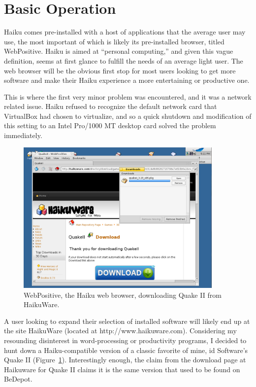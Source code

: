 \documentclass{article}
\newcommand{\figref}[1]{Figure~\ref{fig:#1}}
\begin{document}
\section{Basic Operation}

Haiku comes pre-installed with a host of applications that the average
user may use, the most important of which is likely its pre-installed
browser, titled WebPositive.  Haiku is aimed at ``personal
computing,'' and given this vague definition, seems at first glance to
fulfill the needs of an average light user. The web browser will be
the obvious first stop for most users looking to get more software and
make their Haiku experience a more entertaining or productive one.
	
This is where the first very minor problem was encountered, and it was
a network related issue. Haiku refused to recognize the default
network card that VirtualBox had chosen to virtualize, and so a quick
shutdown and modification of this setting to an Intel Pro/1000 MT
desktop card solved the problem immediately.
	
\begin{figure}[h]
\centering
\includegraphics[width=0.9\textwidth]{figs/using-quake-download.png}
\caption{WebPositive, the Haiku web browser, downloading Quake II from
  HaikuWare.}
\label{fig:using-quake-download}
\end{figure}

A user looking to expand their selection of installed software will
likely end up at the site HaikuWare (located at
http://www.haikuware.com).  Considering my resounding disinterest in
word-processing or productivity programs, I decided to hunt down a
Haiku-compatible version of a classic favorite of mine, id Software's
Quake II (\figref{using-quake-download}).  Interestingly enough, the
claim from the download page at Haikuware for Quake II claims it is
the same version that used to be found on BeDepot.
	
\end{document}
